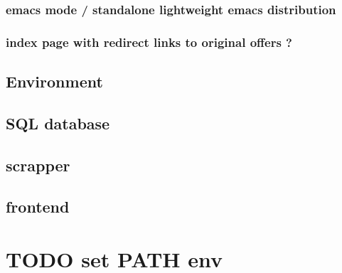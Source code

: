 \documentclass[11pt]{article}
\begin{document}
\subsubsection{emacs mode / standalone lightweight emacs distribution}
\label{sec:orga8ace41}
\subsubsection{index page with redirect  links to original offers ?}
\label{sec:org7d5c863}
\subsection{Environment}
\label{sec:orgb5946bd}
\subsection{SQL database}
\label{sec:org6e84ee5}
\subsection{scrapper}
\label{sec:orga6f25d1}
\subsection{frontend}
\label{sec:org7df9e1f}
\section{{\bfseries\sffamily TODO} set PATH env}
\label{sec:org38d1a3e}
\end{document}
